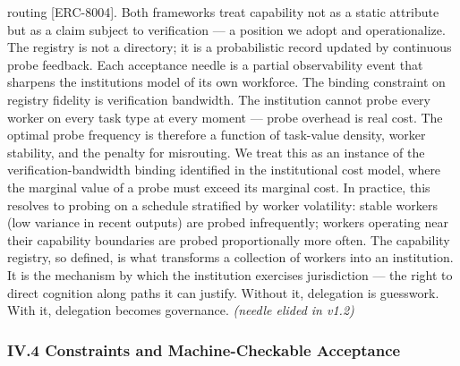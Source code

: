\documentclass[
]{article}
\begin{document}
routing {[}ERC-8004{]}. Both frameworks treat capability not as a static
attribute but as a claim subject to verification --- a position we adopt
and operationalize. The registry is not a directory; it is a
probabilistic record updated by continuous probe feedback. Each
acceptance needle is a partial observability event that sharpens the
institution\textquotesingle s model of its own workforce. The binding
constraint on registry fidelity is verification bandwidth. The
institution cannot probe every worker on every task type at every moment
--- probe overhead is real cost. The optimal probe frequency is
therefore a function of task-value density, worker stability, and the
penalty for misrouting. We treat this as an instance of the
verification-bandwidth binding identified in the institutional cost
model, where the marginal value of a probe must exceed its marginal
cost. In practice, this resolves to probing on a schedule stratified by
worker volatility: stable workers (low variance in recent outputs) are
probed infrequently; workers operating near their capability boundaries
are probed proportionally more often. The capability registry, so
defined, is what transforms a collection of workers into an institution.
It is the mechanism by which the institution exercises jurisdiction ---
the right to direct cognition along paths it can justify. Without it,
delegation is guesswork. With it, delegation becomes governance.
\emph{(needle elided in v1.2)}

\subsubsection{IV.4 Constraints and Machine-Checkable
Acceptance}\label{iv4-constraints-and-machine-checkable-acceptance}
\end{document}

